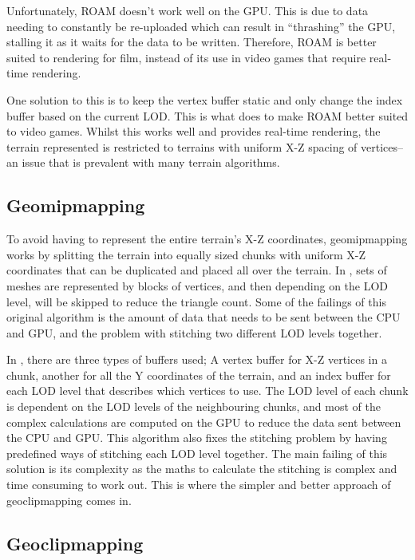 \documentclass[notitlepage,12pt]{article}
\begin{document}
Unfortunately, ROAM doesn't work well on the GPU. This is due to data needing to constantly be re-uploaded which can result in ``thrashing'' the GPU, stalling it as it waits for the data to be written. Therefore, ROAM is better suited to rendering for film, instead of its use in video games that require real-time rendering.

One solution to this is to keep the vertex buffer static and only change the index buffer based on the current LOD. This is what \cite{roamGeomancy} does to make ROAM better suited to video games. Whilst this works well and provides real-time rendering, the terrain represented is restricted to terrains with uniform X-Z spacing of vertices--an issue that is prevalent with many terrain algorithms.

\subsection{Geomipmapping}

To avoid having to represent the entire terrain's X-Z coordinates, geomipmapping works by splitting the terrain into equally sized chunks with uniform X-Z coordinates that can be duplicated and placed all over the terrain. In \cite{geomipmapping}, sets of meshes are represented by blocks of vertices, and then depending on the LOD level, will be skipped to reduce the triangle count. Some of the failings of this original algorithm is the amount of data that needs to be sent between the CPU and GPU, and the problem with stitching two different LOD levels together.

In \cite{geomipmappingScape}, there are three types of buffers used; A vertex buffer for X-Z vertices in a chunk, another for all the Y coordinates of the terrain, and an index buffer for each LOD level that describes which vertices to use. The LOD level of each chunk is dependent on the LOD levels of the neighbouring chunks, and most of the complex calculations are computed on the GPU to reduce the data sent between the CPU and GPU. This algorithm also fixes the stitching problem by having predefined ways of stitching each LOD level together. The main failing of this solution is its complexity as the maths to calculate the stitching is complex and time consuming to work out. This is where the simpler and better approach of geoclipmapping comes in.

\subsection{Geoclipmapping} \label{geoclipmap}
\end{document}
